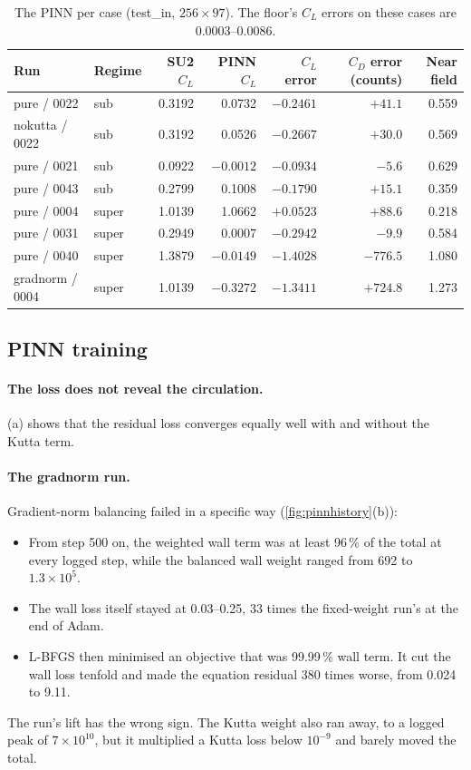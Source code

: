 \documentclass[11pt]{article}
\newcommand{\CL}{C_L}
\newcommand{\CD}{C_D}
\begin{document}
\begin{table}[t]
\centering\small
\caption{The PINN per case (test\_in, $256\times97$). The floor's $\CL$ errors on these cases are
0.0003--0.0086.}
\label{tab:pinncl}
\begin{tabular}{@{}llrrrrr@{}}
\toprule
Run & Regime & SU2 $\CL$ & PINN $\CL$ & $\CL$ error & $\CD$ error (counts) & Near field\\
\midrule
pure / 0022 & sub & 0.3192 & 0.0732 & $-0.2461$ & $+41.1$ & 0.559\\
nokutta / 0022 & sub & 0.3192 & 0.0526 & $-0.2667$ & $+30.0$ & 0.569\\
pure / 0021 & sub & 0.0922 & $-0.0012$ & $-0.0934$ & $-5.6$ & 0.629\\
pure / 0043 & sub & 0.2799 & 0.1008 & $-0.1790$ & $+15.1$ & 0.359\\
pure / 0004 & super & 1.0139 & 1.0662 & $+0.0523$ & $+88.6$ & 0.218\\
pure / 0031 & super & 0.2949 & 0.0007 & $-0.2942$ & $-9.9$ & 0.584\\
pure / 0040 & super & 1.3879 & $-0.0149$ & $-1.4028$ & $-776.5$ & 1.080\\
gradnorm / 0004 & super & 1.0139 & $-0.3272$ & $-1.3411$ & $+724.8$ & 1.273\\
\bottomrule
\end{tabular}
\end{table}

\subsection{PINN training}

\paragraph{The loss does not reveal the circulation.}
(a) shows that the residual loss converges equally well with and without the
Kutta term.

\paragraph{The gradnorm run.}
Gradient-norm balancing failed in a specific way (\cref{fig:pinnhistory}(b)):
\begin{itemize}
  \item From step 500 on, the weighted wall term was at least 96\,\% of the total at every logged
    step, while the balanced wall weight ranged from 692 to $1.3\times10^5$.
  \item The wall loss itself stayed at 0.03--0.25, 33 times the fixed-weight run's at the end of
    Adam.
  \item L-BFGS then minimised an objective that was 99.99\,\% wall term. It cut the wall loss
    tenfold and made the equation residual 380 times worse, from 0.024 to 9.11.
\end{itemize}
The run's lift has the wrong sign. The Kutta weight also ran away, to a logged peak of
$7\times10^{10}$, but it multiplied a Kutta loss below $10^{-9}$ and barely moved the total.
\end{document}
